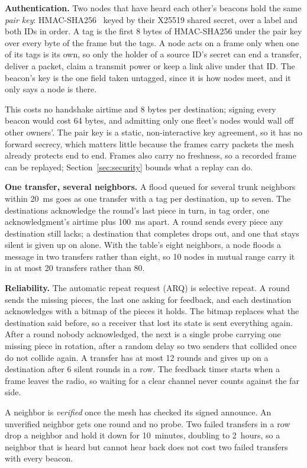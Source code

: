 \documentclass[conference]{IEEEtran}
\begin{document}
\textbf{Authentication.} Two nodes that have heard each other's beacons hold the same \emph{pair key}: HMAC-SHA256~\cite{rfc2104} keyed by their X25519 shared secret, over a label and both IDs in order. A tag is the first 8 bytes of HMAC-SHA256 under the pair key over every byte of the frame but the tags. A node acts on a frame only when one of its tags is its own, so only the holder of a source ID's secret can end a transfer, deliver a packet, claim a transmit power or keep a link alive under that ID. The beacon's key is the one field taken untagged, since it is how nodes meet, and it only says a node is there.

This costs no handshake airtime and 8 bytes per destination; signing every beacon would cost 64 bytes, and admitting only one fleet's nodes would wall off other owners'. The pair key is a static, non-interactive key agreement, so it has no forward secrecy, which matters little because the frames carry packets the mesh already protects end to end. Frames also carry no freshness, so a recorded frame can be replayed; Section~\ref{sec:security} bounds what a replay can do.

\textbf{One transfer, several neighbors.} A flood queued for several trunk neighbors within 20~ms goes as one transfer with a tag per destination, up to seven. The destinations acknowledge the round's last piece in turn, in tag order, one acknowledgment's airtime plus 100~ms apart. A round sends every piece any destination still lacks; a destination that completes drops out, and one that stays silent is given up on alone. With the table's eight neighbors, a node floods a message in two transfers rather than eight, so 10 nodes in mutual range carry it in at most 20 transfers rather than 80.

\textbf{Reliability.} The automatic repeat request (ARQ) is selective repeat. A round sends the missing pieces, the last one asking for feedback, and each destination acknowledges with a bitmap of the pieces it holds. The bitmap replaces what the destination said before, so a receiver that lost its state is sent everything again. After a round nobody acknowledged, the next is a single probe carrying one missing piece in rotation, after a random delay so two senders that collided once do not collide again. A transfer has at most 12 rounds and gives up on a destination after 6 silent rounds in a row. The feedback timer starts when a frame leaves the radio, so waiting for a clear channel never counts against the far side.

A neighbor is \emph{verified} once the mesh has checked its signed announce. An unverified neighbor gets one round and no probe. Two failed transfers in a row drop a neighbor and hold it down for 10~minutes, doubling to 2~hours, so a neighbor that is heard but cannot hear back does not cost two failed transfers with every beacon.
\end{document}

